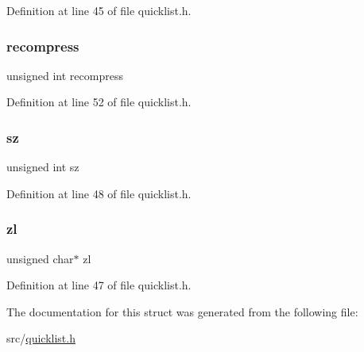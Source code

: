 Definition at line 45 of file quicklist.\+h.

\mbox{\label{structquicklist_node_a614856eb02cf76c6e187226f760c7509}} 
\subsubsection{\texorpdfstring{recompress}{recompress}}
{\footnotesize\ttfamily unsigned int recompress}



Definition at line 52 of file quicklist.\+h.

\mbox{\label{structquicklist_node_a2c1bd10d4bbc82d2d6c052c5842c0c8c}} 
\subsubsection{\texorpdfstring{sz}{sz}}
{\footnotesize\ttfamily unsigned int sz}



Definition at line 48 of file quicklist.\+h.

\mbox{\label{structquicklist_node_a1ae48f85ded0fe46acd8864ac807f6b8}} 
\subsubsection{\texorpdfstring{zl}{zl}}
{\footnotesize\ttfamily unsigned char$\ast$ zl}



Definition at line 47 of file quicklist.\+h.



The documentation for this struct was generated from the following file\+:\begin{DoxyCompactItemize}
\item 
src/\hyperlink{quicklist_8h}{quicklist.\+h}\end{DoxyCompactItemize}
